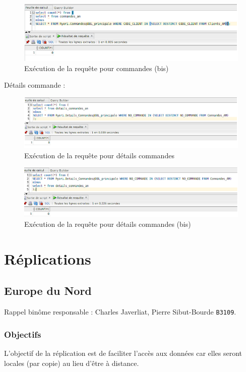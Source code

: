 \documentclass[10pt,a4paper]{article}
\theoremstyle{plain}
\begin{document}
\begin{figure}[H]
	\centering
	\includegraphics[width=15cm]{AM_req4bis.png}
	\caption{Exécution de la requête pour commandes (bis)}
\end{figure}

Détails commande :\\
\begin{figure}[H]
	\centering
	\includegraphics[width=15cm]{AM_req5.png}
	\caption{Exécution de la requête pour détails commandes}
\end{figure}

\begin{figure}[H]
	\centering
	\includegraphics[width=15cm]{AM_req5bis.png}
	\caption{Exécution de la requête pour détails commandes (bis)}
\end{figure}

\newpage

\section{Réplications}
\subsection{Europe du Nord}
Rappel binôme responsable : Charles Javerliat, Pierre Sibut-Bourde \verb|B3109|.
\subsubsection{Objectifs}
L’objectif de la réplication est de faciliter l’accès aux données car elles seront locales (par copie) au lieu d'être à distance.
\end{document}
